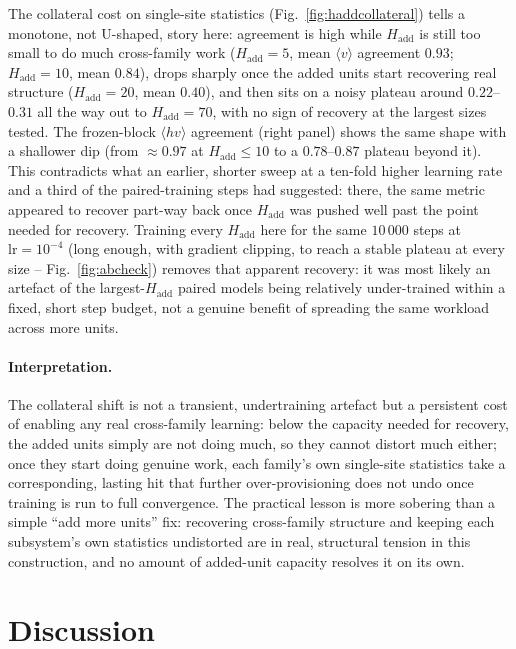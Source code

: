 \documentclass[11pt]{article}
\begin{document}
The collateral cost on single-site statistics (Fig.~\ref{fig:haddcollateral})
tells a monotone, not U-shaped, story here: agreement is high while
$H_{\mathrm{add}}$ is still too small to do much cross-family work
($H_{\mathrm{add}}=5$, mean $\langle v\rangle$ agreement $0.93$;
$H_{\mathrm{add}}=10$, mean $0.84$), drops sharply once the added units
start recovering real structure ($H_{\mathrm{add}}=20$, mean $0.40$), and
then sits on a noisy plateau around $0.22$--$0.31$ all the way out to
$H_{\mathrm{add}}=70$, with no sign of recovery at the largest sizes
tested. The frozen-block $\langle hv\rangle$ agreement (right panel) shows
the same shape with a shallower dip (from $\approx0.97$ at
$H_{\mathrm{add}}\le10$ to a $0.78$--$0.87$ plateau beyond it). This
contradicts what an earlier, shorter sweep at a ten-fold higher learning
rate and a third of the paired-training steps had suggested: there, the
same metric appeared to recover part-way back once $H_{\mathrm{add}}$ was
pushed well past the point needed for recovery. Training every
$H_{\mathrm{add}}$ here for the same $10\,000$ steps at $\mathrm{lr}=10^{-4}$
(long enough, with gradient clipping, to reach a stable plateau at every
size -- Fig.~\ref{fig:abcheck}) removes that apparent recovery: it was
most likely an artefact of the largest-$H_{\mathrm{add}}$ paired models
being relatively under-trained within a fixed, short step budget, not a
genuine benefit of spreading the same workload across more units.

\paragraph{Interpretation.} The collateral shift is not a transient,
undertraining artefact but a persistent cost of enabling any real
cross-family learning: below the capacity needed for recovery, the added
units simply are not doing much, so they cannot distort much either; once
they start doing genuine work, each family's own single-site statistics
take a corresponding, lasting hit that further over-provisioning does not
undo once training is run to full convergence. The practical lesson is
more sobering than a simple ``add more units'' fix: recovering
cross-family structure and keeping each subsystem's own statistics
undistorted are in real, structural tension in this construction, and no
amount of added-unit capacity resolves it on its own.

\section{Discussion}
\end{document}

